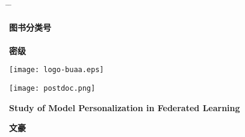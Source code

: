 \thispagestyle{empty}\setcounter{page}{0}

\begin{tabbing}
 \hspace*{0cm} \= \hspace{2.7cm} \= \kill

\underline{\hspace{0.85cm}{\sihao 10006}\hspace{0.85cm}}  \hskip4.1cm
  {\sihao\textbf{图书分类号  }}\underline{\hspace{0.6cm}{\sihao O413}\hspace{0.7cm}}\\ %
  \\
\underline{\hspace{0.85cm}{\sihao B21037}\hspace{0.55cm}}  \hskip4.05cm
  {\sihao\textbf{密\phantom{书分类}级 
 }}\underline{\hspace{2.4cm}}
\end{tabbing}

\vspace{1.2cm}

\begin{center}
 \texttt{[image: logo-buaa.eps]}
\end{center}

\vspace{0.15cm}

\begin{center}
\texttt{[image: postdoc.png]}
\end{center}

\vspace{0.15cm}

\begin{center}{\erhao{}}
\end{center}

\vspace{0.05cm}

\begin{spacing}{2}
\begin{center}{\erhao\bf
Study of Model Personalization in Federated Learning}\end{center}
\end{spacing}

\vspace{0.05cm}

\begin{center}{\xiaoerhao\song\boldmath\bf 文豪}\end{center}

